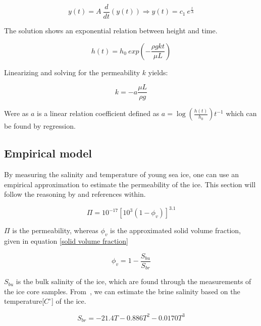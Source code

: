 \begin{equation}
    y(t) = A \: \frac{d}{dt}\left( y(t) \right) \Rightarrow y(t) = c_1 \: e^{\frac{t}{A}}
\end{equation}

The solution shows an exponential relation between height and time.

\begin{equation}\label{diff eq solution}
    h(t) = h_0 \: exp\left(-\frac{\rho g k t}{\mu L}\right)
\end{equation}

Linearizing and solving for the permeability $k$ yields:

\begin{equation}\label{lin.diff sol}
    k = -a\frac{\mu L}{\rho g}
\end{equation}

Were as $a$ is a linear relation coefficient defined as $a = \log\left(\frac{h(t)}{h_0}\right)t^{-1}$ which can be found by regression.

\subsection{Empirical model}\label{subsec:empirical-model}
By measuring the salinity and temperature of young sea ice, one can use an empirical approximation to estimate the permeability of the ice.
This section will follow the reasoning by \cite{src/citations/citation-267564215.bib} and references within.

\begin{equation}\label{emp.eq.perm}
    \Pi = 10^{-17}[10^3(1 - \phi_v)]^{3.1}
\end{equation}

$\Pi$ is the permeability, whereas $\phi_v$ is the approximated solid volume fraction, given in equation \ref{solid volume fraction}

\begin{equation}\label{solid volume fraction}
    \phi_v = 1 - \frac{S_{bu}}{S_{br}}
\end{equation}

$S_{bu}$ is the bulk salinity of the ice, which are found through the measurements of the ice core samples.
From~\cite{src/citations/pericles_21562202c114.bib}, we can estimate the brine salinity based on the temperature[$C^{\circ}$] of the ice.

\begin{equation}\label{brine salinity from temp}
    S_{br} = -21.4T - 0.886T^2 - 0.0170T^3
\end{equation}


